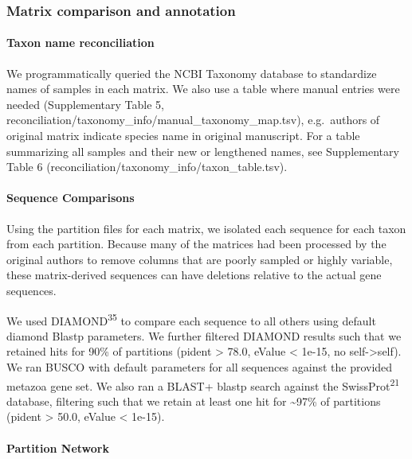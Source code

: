 \documentclass[]{article}
\let\oldparagraph\paragraph
\renewcommand{\paragraph}[1]{\oldparagraph{#1}\mbox{}}
\begin{document}
\hypertarget{matrix-comparison-and-annotation}{%
\subsubsection{Matrix comparison and
annotation}\label{matrix-comparison-and-annotation}}

\hypertarget{taxon-name-reconciliation}{%
\paragraph{Taxon name reconciliation}\label{taxon-name-reconciliation}}

We programmatically queried the NCBI Taxonomy database to standardize
names of samples in each matrix. We also use a table where manual
entries were needed (Supplementary Table 5,
reconciliation/taxonomy\_info/manual\_taxonomy\_map.tsv), e.g.~authors
of original matrix indicate species name in original manuscript. For a
table summarizing all samples and their new or lengthened names, see
Supplementary Table 6 (reconciliation/taxonomy\_info/taxon\_table.tsv).

\hypertarget{sequence-comparisons}{%
\paragraph{Sequence Comparisons}\label{sequence-comparisons}}

Using the partition files for each matrix, we isolated each sequence for
each taxon from each partition. Because many of the matrices had been
processed by the original authors to remove columns that are poorly
sampled or highly variable, these matrix-derived sequences can have
deletions relative to the actual gene sequences.

We used DIAMOND\textsuperscript{35} to compare each sequence to all
others using default diamond Blastp parameters. We further filtered
DIAMOND results such that we retained hits for 90\% of partitions
(pident \textgreater{} 78.0, eValue \textless{} 1e-15, no
self-\textgreater{}self). We ran BUSCO with default parameters for all
sequences against the provided metazoa gene set. We also ran a BLAST+
blastp search against the SwissProt\textsuperscript{21} database,
filtering such that we retain at least one hit for \textasciitilde{}97\%
of partitions (pident \textgreater{} 50.0, eValue \textless{} 1e-15).

\hypertarget{partition-network}{%
\paragraph{Partition Network}\label{partition-network}}
\end{document}

